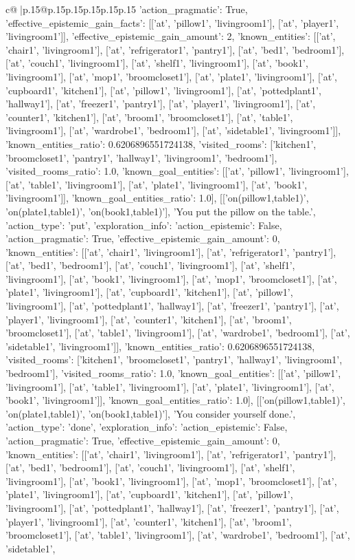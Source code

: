 \documentclass{article}
\begin{document}
{\begin{supertabular}{c@{$\;$}|p{.15\linewidth}@{}p{.15\linewidth}p{.15\linewidth}p{.15\linewidth}p{.15\linewidth}p{.15\linewidth}}
{{{'action_pragmatic': True, 'effective_epistemic_gain_facts': [['at', 'pillow1', 'livingroom1'], ['at', 'player1', 'livingroom1']], 'effective_epistemic_gain_amount': 2, 'known_entities': [['at', 'chair1', 'livingroom1'], ['at', 'refrigerator1', 'pantry1'], ['at', 'bed1', 'bedroom1'], ['at', 'couch1', 'livingroom1'], ['at', 'shelf1', 'livingroom1'], ['at', 'book1', 'livingroom1'], ['at', 'mop1', 'broomcloset1'], ['at', 'plate1', 'livingroom1'], ['at', 'cupboard1', 'kitchen1'], ['at', 'pillow1', 'livingroom1'], ['at', 'pottedplant1', 'hallway1'], ['at', 'freezer1', 'pantry1'], ['at', 'player1', 'livingroom1'], ['at', 'counter1', 'kitchen1'], ['at', 'broom1', 'broomcloset1'], ['at', 'table1', 'livingroom1'], ['at', 'wardrobe1', 'bedroom1'], ['at', 'sidetable1', 'livingroom1']], 'known_entities_ratio': 0.6206896551724138, 'visited_rooms': ['kitchen1', 'broomcloset1', 'pantry1', 'hallway1', 'livingroom1', 'bedroom1'], 'visited_rooms_ratio': 1.0, 'known_goal_entities': [['at', 'pillow1', 'livingroom1'], ['at', 'table1', 'livingroom1'], ['at', 'plate1', 'livingroom1'], ['at', 'book1', 'livingroom1']], 'known_goal_entities_ratio': 1.0}}], [['on(pillow1,table1)', 'on(plate1,table1)', 'on(book1,table1)'], 'You put the pillow on the table.', {'action_type': 'put', 'exploration_info': {'action_epistemic': False, 'action_pragmatic': True, 'effective_epistemic_gain_amount': 0, 'known_entities': [['at', 'chair1', 'livingroom1'], ['at', 'refrigerator1', 'pantry1'], ['at', 'bed1', 'bedroom1'], ['at', 'couch1', 'livingroom1'], ['at', 'shelf1', 'livingroom1'], ['at', 'book1', 'livingroom1'], ['at', 'mop1', 'broomcloset1'], ['at', 'plate1', 'livingroom1'], ['at', 'cupboard1', 'kitchen1'], ['at', 'pillow1', 'livingroom1'], ['at', 'pottedplant1', 'hallway1'], ['at', 'freezer1', 'pantry1'], ['at', 'player1', 'livingroom1'], ['at', 'counter1', 'kitchen1'], ['at', 'broom1', 'broomcloset1'], ['at', 'table1', 'livingroom1'], ['at', 'wardrobe1', 'bedroom1'], ['at', 'sidetable1', 'livingroom1']], 'known_entities_ratio': 0.6206896551724138, 'visited_rooms': ['kitchen1', 'broomcloset1', 'pantry1', 'hallway1', 'livingroom1', 'bedroom1'], 'visited_rooms_ratio': 1.0, 'known_goal_entities': [['at', 'pillow1', 'livingroom1'], ['at', 'table1', 'livingroom1'], ['at', 'plate1', 'livingroom1'], ['at', 'book1', 'livingroom1']], 'known_goal_entities_ratio': 1.0}}], [['on(pillow1,table1)', 'on(plate1,table1)', 'on(book1,table1)'], 'You consider yourself done.', {'action_type': 'done', 'exploration_info': {'action_epistemic': False, 'action_pragmatic': True, 'effective_epistemic_gain_amount': 0, 'known_entities': [['at', 'chair1', 'livingroom1'], ['at', 'refrigerator1', 'pantry1'], ['at', 'bed1', 'bedroom1'], ['at', 'couch1', 'livingroom1'], ['at', 'shelf1', 'livingroom1'], ['at', 'book1', 'livingroom1'], ['at', 'mop1', 'broomcloset1'], ['at', 'plate1', 'livingroom1'], ['at', 'cupboard1', 'kitchen1'], ['at', 'pillow1', 'livingroom1'], ['at', 'pottedplant1', 'hallway1'], ['at', 'freezer1', 'pantry1'], ['at', 'player1', 'livingroom1'], ['at', 'counter1', 'kitchen1'], ['at', 'broom1', 'broomcloset1'], ['at', 'table1', 'livingroom1'], ['at', 'wardrobe1', 'bedroom1'], ['at', 'sidetable1', }}}
\end{supertabular}}
\end{document}
